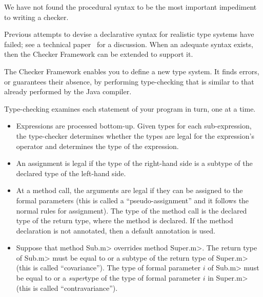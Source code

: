We have not found the procedural syntax to be the most important impediment
to writing a checker.

Previous attempts to devise a declarative syntax
for realistic type systems have failed; see a technical
paper~\cite{PapiACPE2008} for a discussion.  When an
adequate syntax exists, then the Checker Framework can be extended to
support it.





The Checker Framework enables you to define a new type system.  It finds
errors, or guarantees their absence, by performing type-checking that is
similar to that already performed by the Java compiler.

Type-checking examines each statement of your program in turn, one at a time.
\begin{itemize}
\item
Expressions are processed bottom-up.  Given types for each sub-expression,
the type-checker determines whether the types are legal for the
expression's operator and determines the type of the expression.

\item
An assignment is legal if the type of the right-hand side is a subtype of
the declared type of the left-hand side.

\item
 At a method call, the arguments are legal if they can be assigned to the
 formal parameters (this is called a ``pseudo-assignment'' and it follows
 the normal rules for assignment).  The type of the method call is the
 declared type of the return type, where the method is declared.  If
 the method declaration is not annotated, then a default annotation is
 used.

\item
  Suppose that method \<Sub.m> overrides method \<Super.m>.
  The return type of \<Sub.m> must be equal to or a subtype of the return
  type of \<Super.m> (this is called ``covariance'').
  The type of formal parameter $i$ of \<Sub.m> must be equal to or a
  \emph{super}type of the type of formal parameter $i$ in \<Super.m> (this
  is called ``contravariance'').

\end{itemize}


